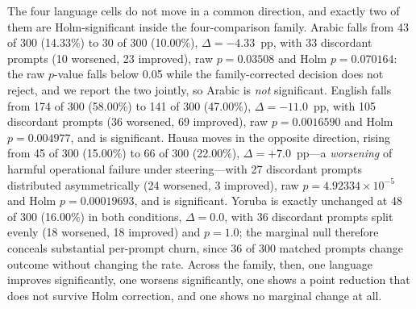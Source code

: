 The four language cells do not move in a common direction, and exactly two of
them are Holm-significant inside the four-comparison family. Arabic falls from
43 of 300 (14.33\%) to 30 of 300 (10.00\%), $\Delta = -4.33$~pp, with 33
discordant prompts (10 worsened, 23 improved), raw $p = 0.03508$ and Holm
$p = 0.070164$: the raw $p$-value falls below 0.05 while the family-corrected
decision does not reject, and we report the two jointly, so Arabic is
\emph{not} significant. English falls from 174 of 300 (58.00\%) to 141 of 300
(47.00\%), $\Delta = -11.0$~pp, with 105 discordant prompts (36 worsened, 69
improved), raw $p = 0.0016590$ and Holm $p = 0.004977$, and is significant.
Hausa moves in the opposite direction, rising from 45 of 300 (15.00\%) to 66 of
300 (22.00\%), $\Delta = +7.0$~pp---a \emph{worsening} of harmful operational
failure under steering---with 27 discordant prompts distributed asymmetrically
(24 worsened, 3 improved), raw $p = 4.92334\times10^{-5}$ and Holm
$p = 0.00019693$, and is significant. Yoruba is exactly unchanged at 48 of 300
(16.00\%) in both conditions, $\Delta = 0.0$, with 36 discordant prompts split
evenly (18 worsened, 18 improved) and $p = 1.0$; the marginal null therefore
conceals substantial per-prompt churn, since 36 of 300 matched prompts change
outcome without changing the rate. Across the family, then, one language
improves significantly, one worsens significantly, one shows a point reduction
that does not survive Holm correction, and one shows no marginal change at all.

